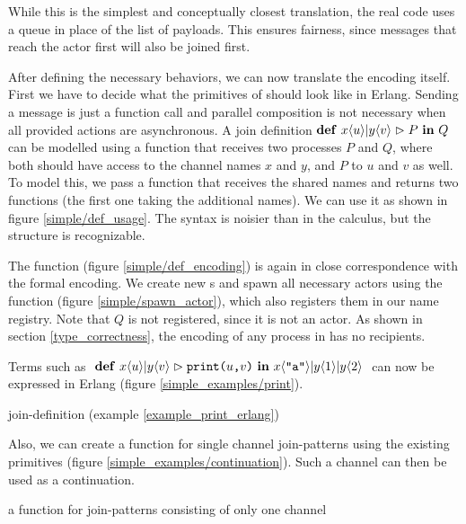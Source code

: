 
While this is the simplest and conceptually closest translation,
the real code uses a queue in place of the list of payloads.
This ensures fairness, since messages that reach the actor first
will also be joined first.

After defining the necessary behaviors,
we can now translate the encoding itself.
First we have to decide what the primitives of \joincalc should look like
in Erlang.
Sending a message is just a function call and parallel composition
is not necessary when all provided actions are asynchronous.
A join definition
$\textbf{\textup{def}} \ x\langle u\rangle | y\langle v\rangle \vartriangleright P \ \textbf{\textup{in}} \ Q$
can be modelled using a function that receives two processes $P$ and $Q$,
where both should have access to the channel names $x$ and $y$,
and $P$ to $u$ and $v$ as well.
To model this, we pass a function that receives the shared names and
returns two functions (the first one taking the additional names).
We can use it as shown in figure \ref{simple/def_usage}.
The syntax is noisier than in the calculus, but the structure is recognizable.


The  function (figure \ref{simple/def_encoding})
is again in close correspondence with the formal encoding.
We create new \actorname{}s and spawn all necessary actors
using the  function (figure \ref{simple/spawn_actor}),
which also registers them in our name registry.
Note that $Q$ is not registered, since it is not an actor.
As shown in section \ref{type_correctness},
the encoding of any process in \joincalc has no recipients.



\begin{example}
  \label{example_print_erlang}
  Terms such as
  $ \ \textbf{\textup{def}} \ x\langle u\rangle | y\langle v\rangle \vartriangleright \texttt{print($u$,$v$)} \ \textbf{\textup{in}} \ x\langle\texttt{"a"}\rangle
        | y\langle1\rangle
        | y\langle2\rangle \ $
  can now be expressed in Erlang
  (figure \ref{simple_examples/print}).

  {join-definition (example \ref{example_print_erlang})}
\end{example}

\begin{example}
  Also, we can create a function for single channel join-patterns using the
  existing primitives
  (figure \ref{simple_examples/continuation}).
  Such a channel can then be used as a continuation.

  {a function for join-patterns consisting of only one channel}
\end{example}
